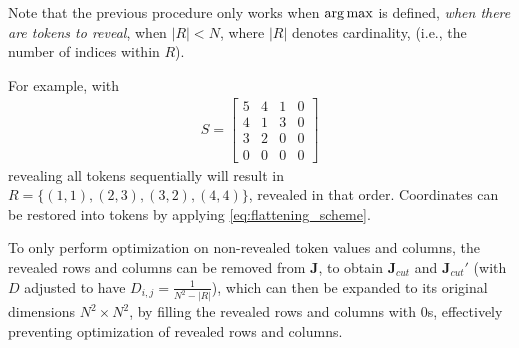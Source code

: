Note that the previous procedure only works when $\operatorname*{arg\,max}$ is defined, \emph{when there are tokens to reveal}, when  $|R|<N$, where $|R|$ denotes cardinality, (i.e., the number of indices within $R$).

For example, with
\begin{align}
S=\begin{bmatrix}
    5&4&1&0\\
    4&1&3&0\\
    3&2&0&0\\
    0&0&0&0
\end{bmatrix}
\end{align}
revealing all tokens sequentially will result in $R=\{(1,1),(2,3),(3,2),(4,4)\}$, revealed in that order. Coordinates can be restored into tokens by applying \autoref{eq:flattening_scheme}.

To only perform optimization on non-revealed token values and columns, the revealed rows and columns can be removed from $\bm{J}$, to obtain $\bm{J}_{cut}$ and $\bm{J}_{cut}'$ (with $D$ adjusted to have $D_{i,j}=\frac{1}{N^2-|R|}$), which can then be expanded to its original dimensions $N^2\times N^2$, by filling the revealed rows and columns with $0$s, effectively preventing optimization of revealed rows and columns.

